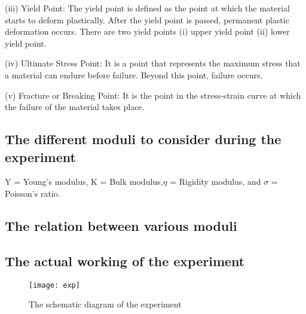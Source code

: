 \documentclass[12pt]{article}
\begin{document}
	(iii) Yield Point: 
	The yield point is defined as the point at which the material starts to deform plastically. After the yield point is passed, permanent plastic deformation occurs. There are two yield points (i) upper yield point (ii) lower yield point.
	
	(iv) Ultimate Stress Point: 
	It is a point that represents the maximum stress that a material can endure before failure. Beyond this point, failure occurs.
	
	(v) Fracture or Breaking Point: 
	It is the point in the stress-strain curve at which the failure of the material takes place.
	
	\subsection{The different moduli to consider during the experiment }
	
	Y = Young’s modulus, K = Bulk modulus,$\eta$ = Rigidity modulus, 
	and $\sigma$ = Poisson’s ratio.
	
	\subsection{The relation between various moduli }
	\begin{center}
	\end{center}

	
	\subsection{The actual working of the experiment }
	
	\begin{figure}[H]
		\centering
		\texttt{[image: exp]}
		\caption{The schematic diagram of the experiment}
		\label{figure:exp}
	\end{figure}
\end{document}
